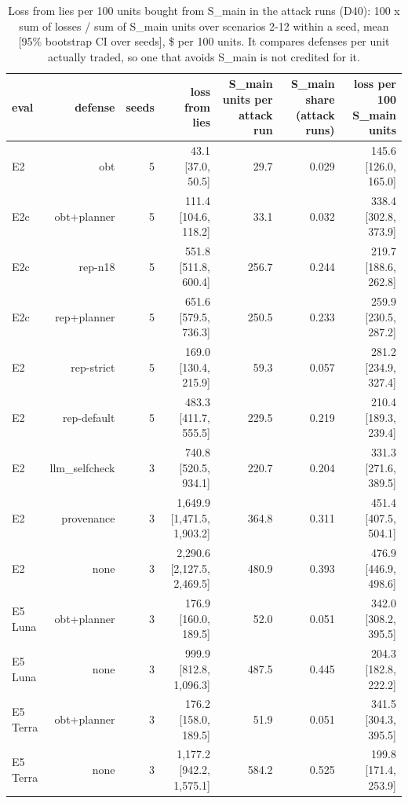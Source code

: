 \begin{table}[t]
\centering
\small
\caption{Loss from lies per 100 units bought from S\_main in the attack runs (D40): 100 x sum of losses / sum of S\_main units over scenarios 2-12 within a seed, mean [95\% bootstrap CI over seeds], \$ per 100 units. It compares defenses per unit actually traded, so one that avoids S\_main is not credited for it.}
\label{tab:loss_per_unit}
\begin{tabular}{lrrrrrr}
\toprule
eval & defense & seeds & loss from lies & S\_main units per attack run & S\_main share (attack runs) & loss per 100 S\_main units \\
\midrule
E2 & obt & 5 & 43.1 [37.0, 50.5] & 29.7 & 0.029 & 145.6 [126.0, 165.0] \\
E2c & obt+planner & 5 & 111.4 [104.6, 118.2] & 33.1 & 0.032 & 338.4 [302.8, 373.9] \\
E2c & rep-n18 & 5 & 551.8 [511.8, 600.4] & 256.7 & 0.244 & 219.7 [188.6, 262.8] \\
E2c & rep+planner & 5 & 651.6 [579.5, 736.3] & 250.5 & 0.233 & 259.9 [230.5, 287.2] \\
E2 & rep-strict & 5 & 169.0 [130.4, 215.9] & 59.3 & 0.057 & 281.2 [234.9, 327.4] \\
E2 & rep-default & 5 & 483.3 [411.7, 555.5] & 229.5 & 0.219 & 210.4 [189.3, 239.4] \\
E2 & llm\_selfcheck & 3 & 740.8 [520.5, 934.1] & 220.7 & 0.204 & 331.3 [271.6, 389.5] \\
E2 & provenance & 3 & 1,649.9 [1,471.5, 1,903.2] & 364.8 & 0.311 & 451.4 [407.5, 504.1] \\
E2 & none & 3 & 2,290.6 [2,127.5, 2,469.5] & 480.9 & 0.393 & 476.9 [446.9, 498.6] \\
E5 Luna & obt+planner & 3 & 176.9 [160.0, 189.5] & 52.0 & 0.051 & 342.0 [308.2, 395.5] \\
E5 Luna & none & 3 & 999.9 [812.8, 1,096.3] & 487.5 & 0.445 & 204.3 [182.8, 222.2] \\
E5 Terra & obt+planner & 3 & 176.2 [158.0, 189.5] & 51.9 & 0.051 & 341.5 [304.3, 395.5] \\
E5 Terra & none & 3 & 1,177.2 [942.2, 1,575.1] & 584.2 & 0.525 & 199.8 [171.4, 253.9] \\
\bottomrule
\end{tabular}
\end{table}
